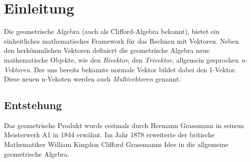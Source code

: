 %
%
%
%
\section{Einleitung\label{geoalgebra:section:teil0}}
Die geometrische Algebra (auch als Clifford-Algebra bekannt), bietet ein einheitliches mathematisches
Framework für das Rechnen mit Vektoren.
Neben den herkömmlichen Vektoren definiert die geometrische
Algebra neue mathematische Objekte, wie den \emph{Bivektor}, den \emph{Trivektor}, allgemein gesprochen
\emph{n-Vektoren}.
Der uns bereits bekannte normale Vektor bildet dabei den 1-Vektor. Diese neuen n-Vekoten werden auch
\emph{Multivektoren} genannt.

\subsection{Entstehung}
Das geometrische Produkt wurde erstmals durch Hermann Grassmann in seinem Meisterwerk \glqq{}A1\grqq{} in 1844
erwähnt. Im Jahr 1878 erweiterte der britische Mathematiker William Kingdon Clifford Grassmanns Idee
in die allgemeine geometrische Algebra. 

